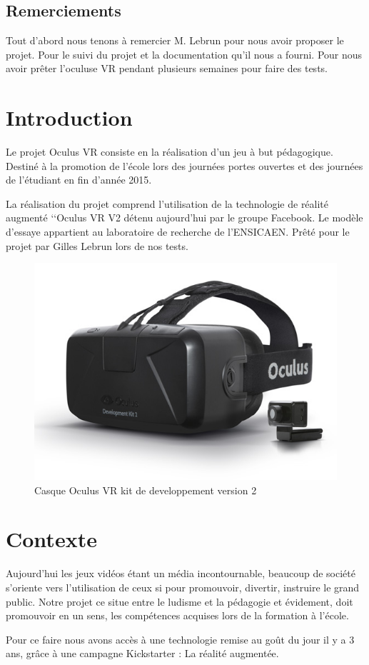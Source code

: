 \documentclass[a4paper,11pt]{myreport}
\begin{document}
\setlength{\textheight}{26cm}
\setlength{\topmargin}{-2cm}

\tableofcontents


\listoffigures
\section*{Remerciements}
\par Tout d'abord nous tenons à remercier M. Lebrun pour nous avoir proposer le projet. Pour le suivi du projet et la documentation qu'il nous a fourni.
Pour nous avoir prêter l'oculuse VR pendant plusieurs semaines pour faire des tests.
\chapter{Introduction}
\par Le projet Oculus VR consiste en la réalisation d'un jeu à but pédagogique. Destiné à la promotion de l'école lors des journées portes ouvertes et des journées de l'étudiant en fin d'année 2015.
\par La réalisation du projet comprend l'utilisation de la technologie de réalité augmenté \lq\lq{Oculus VR V2} détenu aujourd'hui par le groupe Facebook. Le modèle d'essaye appartient au laboratoire de recherche de l'ENSICAEN. Prêté pour le projet par Gilles Lebrun lors de nos tests.
\begin{figure}[h] 
	\includegraphics[scale=0.70]{./images/dk2-product.jpg}
	\caption{Casque Oculus VR kit de developpement version 2}
\end{figure}
\chapter{Contexte}
\par Aujourd'hui les jeux vidéos étant un média incontournable, beaucoup de société s'oriente vers l'utilisation de ceux si pour promouvoir, divertir, instruire le grand public. Notre projet ce situe entre le ludisme et la pédagogie et évidement, doit promouvoir en un sens, les compétences acquises lors de la formation à l'école.
\par Pour ce faire nous avons accès à une technologie remise au goût du jour il y a 3 ans, grâce à une campagne Kickstarter : La réalité augmentée.
\end{document}
